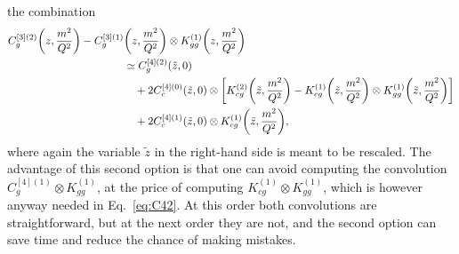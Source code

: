 \documentclass[a4paper,10pt]{article}
\newcommand{\zapp}{\tilde z}
\let\originalleft\left
\let\originalright\right
\renewcommand{\left}{\mathopen{}\mathclose\bgroup\originalleft}
\renewcommand{\right}{\aftergroup\egroup\originalright}
\def\({\left(}
\def\){\right)}
\def\[{\left[}
\def\]{\right]}
\begin{document}
the combination
\begin{align}
C_g^{[3](2)}\(z,\frac{m^2}{Q^2}\) -C_g^{[3](1)}&\(z,\frac{m^2}{Q^2}\) \otimes K_{gg}^{(1)}\(z,\frac{m^2}{Q^2}\) \nonumber\\
&\simeq C_g^{[4](2)}\(\zapp,0\)
\nonumber\\ &\quad
+2C_c^{[4](0)}(\zapp,0)\otimes \[K_{cg}^{(2)}\(\zapp,\frac{m^2}{Q^2}\)-K_{cg}^{(1)}\(\zapp,\frac{m^2}{Q^2}\)\otimes K_{gg}^{(1)}\(\zapp,\frac{m^2}{Q^2}\)\]
\nonumber\\ &\quad
+2C_c^{[4](1)}(\zapp,0)\otimes K_{cg}^{(1)}\(\zapp,\frac{m^2}{Q^2}\),
\end{align}
where again the variable $\zapp$ in the right-hand side is meant to be rescaled.
The advantage of this second option is that one can avoid computing the convolution
$C_g^{[4](1)}\otimes K_{gg}^{(1)}$, at the price of computing $K_{cg}^{(1)}\otimes K_{gg}^{(1)}$,
which is however anyway needed in Eq.~\eqref{eq:C42}.
At this order both convolutions are straightforward, but at the next order they are not,
and the second option can save time and reduce the chance of making mistakes.
\end{document}
